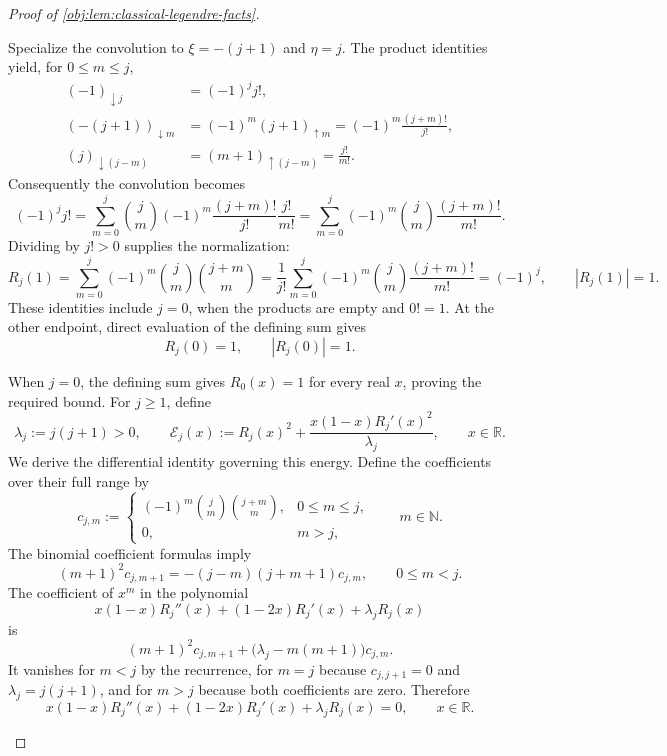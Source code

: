 \begin{proof}[Proof of \cref{obj:lem:classical-legendre-facts}]
\begin{enumerate}
Specialize the convolution to \(\xi=-(j+1)\) and \(\eta=j\). The product identities yield, for \(0\le m\le j\),
\[
\begin{aligned}
(-1)_{\downarrow j}&=(-1)^j j!,\\
(-(j+1))_{\downarrow m}
&=(-1)^m(j+1)_{\uparrow m}
=(-1)^m\frac{(j+m)!}{j!},\\
(j)_{\downarrow(j-m)}
&=(m+1)_{\uparrow(j-m)}
=\frac{j!}{m!}.
\end{aligned}
\]
Consequently the convolution becomes
\[
(-1)^j j!
=\sum_{m=0}^j\binom jm(-1)^m
  \frac{(j+m)!}{j!}\frac{j!}{m!}
=\sum_{m=0}^j(-1)^m\binom jm\frac{(j+m)!}{m!}.
\]
Dividing by \(j!>0\) supplies the normalization:
\[
R_j(1)
=\sum_{m=0}^j(-1)^m\binom jm\binom{j+m}{m}
=\frac{1}{j!}\sum_{m=0}^j(-1)^m\binom jm\frac{(j+m)!}{m!}
=(-1)^j,
\qquad |R_j(1)|=1.
\]
These identities include \(j=0\), when the products are empty and \(0!=1\).
At the other endpoint, direct evaluation of the defining sum gives
\[
R_j(0)=1,
\qquad |R_j(0)|=1.
\]

When \(j=0\), the defining sum gives \(R_0(x)=1\) for every real \(x\), proving the required bound. For \(j\ge1\), define
\[
\lambda_j:=j(j+1)>0,
\qquad
\mathcal E_j(x):=
R_j(x)^2+\frac{x(1-x)R_j'(x)^2}{\lambda_j},
\qquad x\in\mathbb R.
\]
We derive the differential identity governing this energy. Define the coefficients over their full range by
\[
c_{j,m}:=
\begin{cases}
(-1)^m\binom jm\binom{j+m}{m},&0\le m\le j,\\
0,&m>j,
\end{cases}
\qquad m\in\mathbb N.
\]
The binomial coefficient formulas imply
\[
(m+1)^2c_{j,m+1}
=-(j-m)(j+m+1)c_{j,m},
\qquad 0\le m<j.
\]
The coefficient of \(x^m\) in the polynomial
\[
x(1-x)R_j''(x)+(1-2x)R_j'(x)+\lambda_jR_j(x)
\]
is
\[
(m+1)^2c_{j,m+1}
+\bigl(\lambda_j-m(m+1)\bigr)c_{j,m}.
\]
It vanishes for \(m<j\) by the recurrence, for \(m=j\) because \(c_{j,j+1}=0\) and \(\lambda_j=j(j+1)\), and for \(m>j\) because both coefficients are zero. Therefore
\[
x(1-x)R_j''(x)+(1-2x)R_j'(x)+\lambda_jR_j(x)=0,
\qquad x\in\mathbb R.
\]


\end{enumerate}
\end{proof}
